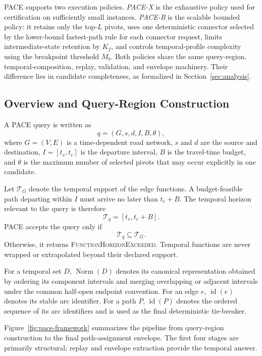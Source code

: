 \documentclass[a4paper,fleqn]{cas-dc}
\begin{document}
PACE supports two execution policies. \emph{PACE-X} is the exhaustive policy
used for certification on sufficiently small instances. \emph{PACE-B} is the
scalable bounded policy: it retains only the top-\(L\) pivots, uses one deterministic connector selected by the lower-bound fastest-path rule for each connector request, limits intermediate-state
retention by \(K_f\), and controls temporal-profile complexity using the
breakpoint threshold \(M_b\). Both policies share the same query-region,
temporal-composition, replay, validation, and envelope machinery. Their
difference lies in candidate completeness, as formalized in
Section~\ref{sec:analysis}.

\subsection{Overview and Query-Region Construction}
\label{subsec:pace_region}

A PACE query is written as
\[
q=(G,s,d,I,B,\theta),
\]
where \(G=(V,E)\) is a time-dependent road network, \(s\) and \(d\) are the
source and destination, \(I=[t_s,t_e]\) is the departure interval, \(B\) is
the travel-time budget, and \(\theta\) is the maximum number of selected
pivots that may occur explicitly in one candidate.

Let \(\mathcal{T}_G\) denote the temporal support of the edge functions. A
budget-feasible path departing within \(I\) must arrive no later than
\(t_e+B\). The temporal horizon relevant to the query is therefore
\[
\mathcal{T}_q=[t_s,t_e+B].
\]
PACE accepts the query only if
\[
\mathcal{T}_q\subseteq\mathcal{T}_G.
\]
Otherwise, it returns \textsc{FunctionHorizonExceeded}. Temporal functions are
never wrapped or extrapolated beyond their declared support.

For a temporal set \(D\), \(\operatorname{Norm}(D)\) denotes its canonical
representation obtained by ordering its component intervals and merging
overlapping or adjacent intervals under the common half-open endpoint
convention. For an edge \(e\), \(\operatorname{id}(e)\) denotes its stable arc
identifier. For a path \(P\), \(\operatorname{id}(P)\) denotes the ordered
sequence of its arc identifiers and is used as the final deterministic
tie-breaker.

Figure~\ref{fig:pace-framework} summarizes the pipeline from query-region
construction to the final path-assignment envelope. The first four stages are
primarily structural; replay and envelope extraction provide the temporal
answer.
\end{document}
